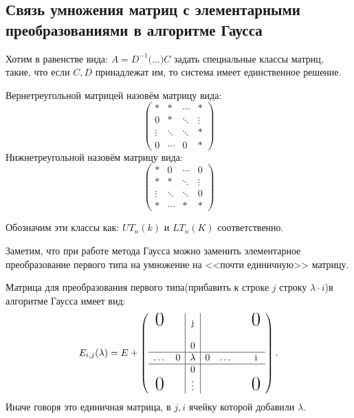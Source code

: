 \subsection{Связь умножения матриц с элементарными преобразованиями в алгоритме Гаусса}
\begin{motivation}
    Хотим в равенстве вида:
    $A = D^{-1}\big(\dots\big)C$
    задать специальные классы матриц, такие, что если
    $C,D$ принадлежат им, то система имеет единственное решение.
\end{motivation}
\begin{definition}
    Вернетреугольной матрицей назовём матрицу вида:$$\begin{pmatrix}
        * & * & \cdots & *\\
        0 & * & \ddots & \vdots\\
        \vdots & \ddots & \ddots & *\\
        0 & \cdots& 0& *
    \end{pmatrix}
    $$
    Нижнетреугольной назовём матрицу вида: $$\begin{pmatrix}
        * & 0 & \cdots & 0\\
        * & * & \ddots & \vdots\\
        \vdots & \ddots & \ddots & 0\\
        * & \cdots& *& *
    \end{pmatrix}
    $$

    Обозначим эти классы как: $UT_n(k)$ и $LT_n(K)$ соответственно.
\end{definition}
\begin{remark}
    Заметим, что при работе метода Гаусса
    можно заменить элементарное преобразование первого типа на 
    умножение на <<почти единичную>> матрицу.
\end{remark}
\begin{definition}
    Матрица для преобразования первого типа(прибавить
    к строке $j$ строку $\lambda \cdot i$)в алгоритме
    Гаусса имеет вид: 
    \[
        E_{i,j}(\lambda) = E +
        \left(\begin{array}{cc|c|cccc}
            \text{\huge 0}&&\text{\small j}&&&&\text{\huge 0}\\
            &&&&&&\\
            &&0&&&&\\
            \hline
            \dots&0&\lambda&0&\dots&&\text{\small i}\\
            \hline
            &&0&&&\\
            \text{\huge 0}&&\vdots&&&&\text{\huge 0}\\
        \end{array}\right) 
    .\] 
    Иначе говоря это единичная матрица, в $j, i$ ячейку 
    которой добавили $\lambda$.
\end{definition}
